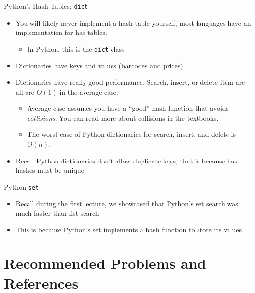 \documentclass[
  ignorenonframetext,
]{beamer}
\providecommand{\tightlist}{%
  \setlength{\itemsep}{0pt}\setlength{\parskip}{0pt}}\usepackage{longtable,booktabs,array}
\begin{document}
\begin{frame}[fragile]{Python's Hash Tables: \texttt{dict}}
\protect\hypertarget{pythons-hash-tables-dict}{}
\begin{itemize}
\item
  You will likely never implement a hash table yourself, most languages
  have an implementation for has tables.

  \begin{itemize}
  \tightlist
  \item
    In Python, this is the \texttt{dict} class
  \end{itemize}
\item
  Dictionaries have keys and values (barcodes and prices)
\item
  Dictionaries have really good performance. Search, insert, or delete
  item are all are \(O(1)\) in the average case.

  \begin{itemize}
  \item
    Average case assumes you have a ``good'' hash function that avoids
    \emph{collisions}. You can read more about collisions in the
    textbooks.
  \item
    The worst case of Python dictionaries for search, insert, and delete
    is \(O(n)\).
  \end{itemize}
\item
  Recall Python dictionaries don't allow duplicate keys, that is because
  has hashes must be unique!
\end{itemize}
\end{frame}

\begin{frame}{Python \texttt{set}}
\protect\hypertarget{python-set}{}
\begin{itemize}
\item
  Recall during the first lecture, we showcased that Python's set search
  was much faster than list search
\item
  This is because Python's set implements a hash function to store its
  values
\end{itemize}
\end{frame}

\hypertarget{recommended-problems-and-references}{%
\section{Recommended Problems and
References}\label{recommended-problems-and-references}}
\end{document}
